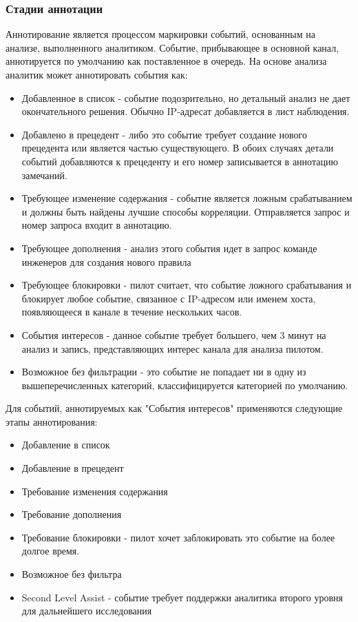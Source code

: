 \documentclass[12pt,]{article}
\begin{document}
\subsubsection{Стадии аннотации}
Аннотирование является процессом маркировки событий, основанным на анализе, выполненного аналитиком. Событие, прибывающее в основной канал, аннотируется по умолчанию как поставленное в очередь. На основе анализа аналитик может аннотировать события как:
\begin{itemize}
\item Добавленное в список - событие подозрительно, но детальный анализ не дает окончательного решения. Обычно IP-адресат добавляется в лист наблюдения.
\item Добавлено в прецедент - либо это событие требует создание нового прецедента или является частью существующего. В обоих случаях детали событий добавляются к прецеденту и его номер записывается в аннотацию замечаний.
\item Требующее изменение содержания - событие является ложным срабатыванием и должны быть найдены лучшие способы корреляции. Отправляется запрос и номер запроса входит в аннотацию.
\item Требующее дополнения -  анализ этого события идет в запрос команде инженеров для создания нового правила
\item Требующее блокировки - пилот считает, что событие ложного срабатывания и блокирует любое событие, связанное с IP-адресом или именем хоста, появляющееся в канале в течение нескольких часов.
\item События интересов - данное событие требует большего, чем 3 минут на анализ и запись, представляющих интерес канала для анализа пилотом.
\item Возможное без фильтрации - это событие не попадает ни в одну из вышеперечисленных категорий, классифицируется категорией по умолчанию.
\end{itemize}
Для событий, аннотируемых как "События интересов" применяются следующие этапы аннотирования:
\begin{itemize}
  \item Добавление в список
  \item Добавление в прецедент
  \item Требование изменения содержания
  \item Требование дополнения
  \item Требование блокировки - пилот хочет заблокировать это событие на более долгое время.
  \item Возможное без фильтра
  \item Second Level Assist - событие требует поддержки аналитика второго уровня для дальнейшего исследования
\end{itemize}
\end{document}
